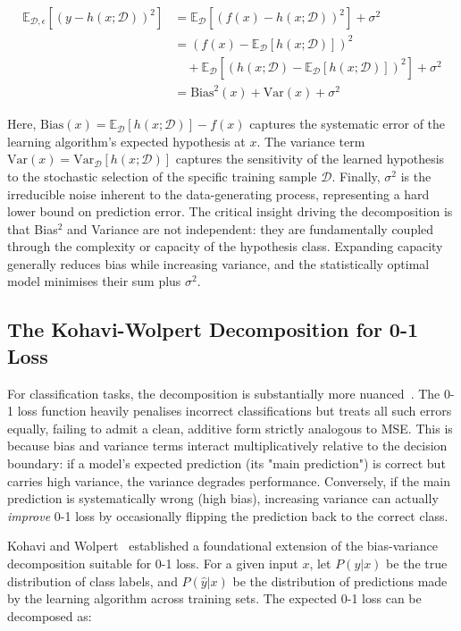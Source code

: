 \documentclass[conference]{IEEEtran}
\begin{document}
\begin{align}
\mathbb{E}_{\mathcal{D}, \epsilon}\left[(y - h(x; \mathcal{D}))^2\right] &= \mathbb{E}_{\mathcal{D}}\left[(f(x) - h(x; \mathcal{D}))^2\right] + \sigma^2 \nonumber \\
&= \left(f(x) - \mathbb{E}_{\mathcal{D}}[h(x; \mathcal{D})]\right)^2 \nonumber \\
&\quad + \mathbb{E}_{\mathcal{D}}\left[\left(h(x; \mathcal{D}) - \mathbb{E}_{\mathcal{D}}[h(x; \mathcal{D})]\right)^2\right] + \sigma^2 \nonumber \\
&= \text{Bias}^2(x) + \text{Var}(x) + \sigma^2
\end{align}

Here, $\text{Bias}(x) = \mathbb{E}_{\mathcal{D}}[h(x; \mathcal{D})] - f(x)$ captures the systematic error of the learning algorithm's expected hypothesis at $x$. The variance term $\text{Var}(x) = \text{Var}_{\mathcal{D}}[h(x; \mathcal{D})]$ captures the sensitivity of the learned hypothesis to the stochastic selection of the specific training sample $\mathcal{D}$. Finally, $\sigma^2$ is the irreducible noise inherent to the data-generating process, representing a hard lower bound on prediction error. The critical insight driving the decomposition is that Bias$^2$ and Variance are not independent: they are fundamentally coupled through the complexity or capacity of the hypothesis class. Expanding capacity generally reduces bias while increasing variance, and the statistically optimal model minimises their sum plus $\sigma^2$.

\subsection{The Kohavi-Wolpert Decomposition for 0-1 Loss}

For classification tasks, the decomposition is substantially more nuanced~\cite{b2}. The 0-1 loss function heavily penalises incorrect classifications but treats all such errors equally, failing to admit a clean, additive form strictly analogous to MSE. This is because bias and variance terms interact multiplicatively relative to the decision boundary: if a model's expected prediction (its "main prediction") is correct but carries high variance, the variance degrades performance. Conversely, if the main prediction is systematically wrong (high bias), increasing variance can actually \textit{improve} 0-1 loss by occasionally flipping the prediction back to the correct class.

Kohavi and Wolpert~\cite{b40} established a foundational extension of the bias-variance decomposition suitable for 0-1 loss. For a given input $x$, let $P(y|x)$ be the true distribution of class labels, and $P(\hat{y}|x)$ be the distribution of predictions made by the learning algorithm across training sets. The expected 0-1 loss can be decomposed as:
\end{document}
